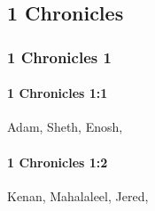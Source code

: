 \subsection{1 Chronicles}
	\label{1CHRONICLES}

	\subsubsection{1 Chronicles 1} %
		\label{1CHRONICLES-1}

		\paragraph{1 Chronicles 1:1} %
			\label{1CHRONICLES-1-1}

			Adam, Sheth, Enosh,


		\paragraph{1 Chronicles 1:2} %
			\label{1CHRONICLES-1-2}

			Kenan, Mahalaleel, Jered,

